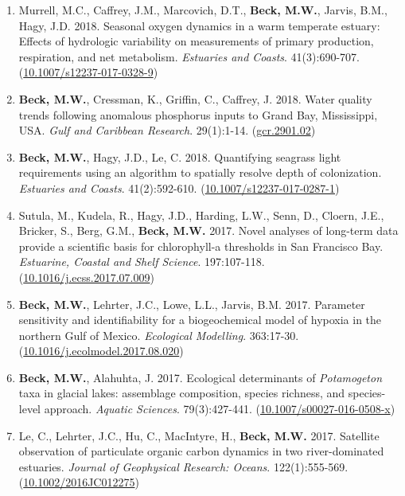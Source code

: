 \documentclass[letterpaper,12pt]{article}
\begin{document}
\begin{enumerate}
\item Murrell, M.C., Caffrey, J.M., Marcovich, D.T., \textbf{Beck, M.W.}, Jarvis, B.M., Hagy, J.D. 2018. Seasonal oxygen dynamics in a warm temperate estuary: Effects of hydrologic variability on measurements of primary production, respiration, and net metabolism. \textit{Estuaries and Coasts}. 41(3):690-707. ({\footnotesize\href{https://link.springer.com/article/10.1007/s12237-017-0328-9}{10.1007/s12237-017-0328-9}})

\item \textbf{Beck, M.W.}, Cressman, K., Griffin, C., Caffrey, J. 2018. Water quality trends following anomalous phosphorus inputs to Grand Bay, Mississippi, USA. \textit{Gulf and Caribbean Research}. 29(1):1-14. ({\footnotesize\href{https://aquila.usm.edu/gcr/vol29/iss1/2/}{gcr.2901.02}})

\item \textbf{Beck, M.W.}, Hagy, J.D., Le, C. 2018. Quantifying seagrass light requirements using an algorithm to spatially resolve depth of colonization. \textit{Estuaries and Coasts}. 41(2):592-610. ({\footnotesize\href{http://dx.doi.org/10.1007/s12237-017-0287-1}{10.1007/s12237-017-0287-1}})

\item Sutula, M., Kudela, R., Hagy, J.D., Harding, L.W., Senn, D., Cloern, J.E., Bricker, S., Berg, G.M., \textbf{Beck, M.W.} 2017. Novel analyses of long-term data provide a scientific basis for chlorophyll-a thresholds in San Francisco Bay. \textit{Estuarine, Coastal and Shelf Science}. 197:107-118. ({\footnotesize\href{https://doi.org/10.1016/j.ecss.2017.07.009}{10.1016/j.ecss.2017.07.009}})

\item \textbf{Beck, M.W.}, Lehrter, J.C., Lowe, L.L., Jarvis, B.M. 2017. Parameter sensitivity and identifiability for a biogeochemical model of hypoxia in the northern Gulf of Mexico. \textit{Ecological Modelling}. 363:17-30. ({\footnotesize\href{http://dx.doi.org/10.1016/j.ecolmodel.2017.08.020}{10.1016/j.ecolmodel.2017.08.020}})

\item \textbf{Beck, M.W.}, Alahuhta, J. 2017. Ecological determinants of \textit{Potamogeton} taxa in glacial lakes: assemblage composition, species richness, and species-level approach. \textit{Aquatic Sciences}. 79(3):427-441. ({\footnotesize\href{https://doi.org/10.1007/s00027-016-0508-x}{10.1007/s00027-016-0508-x}})

\item Le, C., Lehrter, J.C., Hu, C., MacIntyre, H., \textbf{Beck, M.W.} 2017. Satellite observation of particulate organic carbon dynamics in two river-dominated estuaries. \textit{Journal of Geophysical Research: Oceans}. 122(1):555-569. ({\footnotesize\href{http://dx.doi.org/10.1002/2016JC012275}{10.1002/2016JC012275}})


\end{enumerate}
\end{document}
